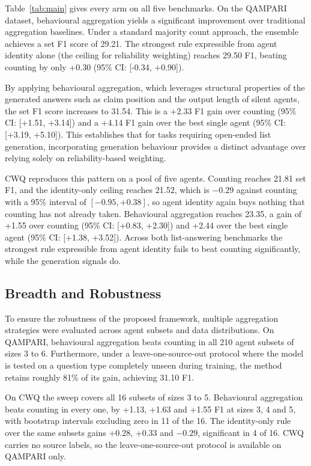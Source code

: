 \documentclass[11pt]{article}
\begin{document}

Table~\ref{tab:main} gives every arm on all five benchmarks. On the QAMPARI dataset, behavioural aggregation yields a significant improvement over traditional aggregation baselines. Under a standard majority count approach, the ensemble achieves a set F1 score of 29.21. The strongest rule expressible from agent identity alone (the ceiling for reliability weighting) reaches 29.50 F1, beating counting by only +0.30 (95\% CI: [-0.34, +0.90]).

By applying behavioural aggregation, which leverages structural properties of the generated answers such as claim position and the output length of silent agents, the set F1 score increases to 31.54. This is a +2.33 F1 gain over counting (95\% CI: [+1.51, +3.14]) and a +4.14 F1 gain over the best single agent (95\% CI: [+3.19, +5.10]). This establishes that for tasks requiring open-ended list generation, incorporating generation behaviour provides a distinct advantage over relying solely on reliability-based weighting.

CWQ reproduces this pattern on a pool of five agents. Counting reaches 21.81 set F1, and the identity-only ceiling reaches 21.52, which is $-0.29$ against counting with a 95\% interval of $[-0.95, +0.38]$, so agent identity again buys nothing that counting has not already taken. Behavioural aggregation reaches 23.35, a gain of +1.55 over counting (95\% CI: [+0.83, +2.30]) and +2.44 over the best single agent (95\% CI: [+1.38, +3.52]). Across both list-answering benchmarks the strongest rule expressible from agent identity fails to beat counting significantly, while the generation signals do.


\subsection{Breadth and Robustness}
\label{sec:breadth}
\label{sec:robust}

To ensure the robustness of the proposed framework, multiple aggregation strategies were evaluated across agent subsets and data distributions. On QAMPARI, behavioural aggregation beats counting in all 210 agent subsets of sizes 3 to 6. Furthermore, under a leave-one-source-out protocol where the model is tested on a question type completely unseen during training, the method retains roughly 81\% of its gain, achieving 31.10 F1.

On CWQ the sweep covers all 16 subsets of sizes 3 to 5. Behavioural aggregation beats counting in every one, by +1.13, +1.63 and +1.55 F1 at sizes 3, 4 and 5, with bootstrap intervals excluding zero in 11 of the 16. The identity-only rule over the same subsets gains +0.28, +0.33 and $-0.29$, significant in 4 of 16. CWQ carries no source labels, so the leave-one-source-out protocol is available on QAMPARI only.
\end{document}
